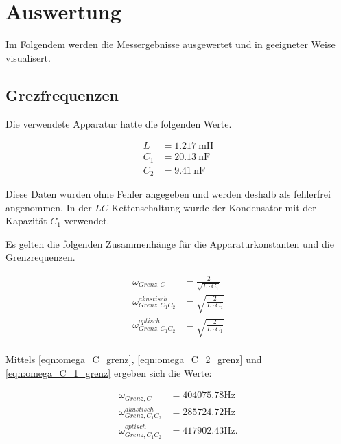 %

%

\section{Auswertung}

Im Folgendem werden die Messergebnisse ausgewertet und in geeigneter
Weise visualisert.

\subsection{Grezfrequenzen}

Die verwendete Apparatur hatte die folgenden Werte.

\begin{align}
  \label{L}
  L &= \SI{1,217}{\milli\henry}\\
  \label{C1}
  C_1 &= \SI{20,13}{\nano\farad}\\
  \label{C2}
  C_2 &= \SI{9,41}{\nano\farad}
\end{align}

Diese Daten wurden ohne Fehler angegeben und werden deshalb als fehlerfrei
angenommen. In der $LC$-Kettenschaltung wurde der Kondensator mit der
Kapazität $C_1$ verwendet.

Es gelten die folgenden Zusammenhänge für die Apparaturkonstanten und die
Grenzrequenzen.

\begin{align}
  \label{eqn:omega_C_grenz}
  \omega_{Grenz,C} &= \frac{2}{\sqrt{L\cdot C_1}} \\
  \label{eqn:omega_C_2_grenz}
  \omega_{Grenz,C_1C_2}^{akustisch} &= \sqrt{\frac{2}{L\cdot C_2}} \\
  \label{eqn:omega_C_1_grenz}
  \omega_{Grenz,C_1C_2}^{optisch} &= \sqrt{\frac{2}{L\cdot C_1}} \\
\end{align}

Mittels \eqref{eqn:omega_C_grenz}, \eqref{eqn:omega_C_2_grenz} und
\eqref{eqn:omega_C_1_grenz} ergeben sich die Werte:

\begin{align*}
  \omega_{Grenz,C} &= \num{404075,78}\si{\hertz}\\
  \omega_{Grenz,C_1C_2}^{akustisch} &= \num{285724,72}\si{\hertz}\\
  \omega_{Grenz,C_1C_2}^{optisch} &= \num{417902,43}\si{\hertz}.\\
\end{align*}

